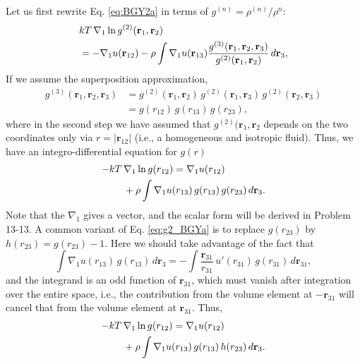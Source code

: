 \documentclass[twocolumn, 10pt]{article}
\numberwithin{equation}{section}
\begin{document}
Let us first rewrite
Eq. \eqref{eq:BGY2a}
in terms of $g^{(n)} = \rho^{(n)}/\rho^n$:
\begin{align}
  & kT \, \nabla_1 \ln g^{(2)}(\mathbf r_1, \mathbf r_2)
  \notag \\
  &=
  -\nabla_1 u(\mathbf r_{12})
  -
  \rho \int
  \nabla_1 u(\mathbf r_{13})
    \frac{
      g^{(3)}(\mathbf r_1, \mathbf r_2, \mathbf r_{3})
    }{
      g^{(2)}(\mathbf r_1, \mathbf r_2)
    }
    \,
  d\mathbf r_3
  ,
  \label{eq:g2_BGYd}
\end{align}
%
If we assume the superposition approximation,
\begin{align*}
  g^{(3)}(\mathbf r_1,\mathbf r_2,\mathbf r_3)
  &=
  g^{(2)}(\mathbf r_1,\mathbf r_2) \,
  g^{(2)}(\mathbf r_1,\mathbf r_3) \,
  g^{(2)}(\mathbf r_2,\mathbf r_3)
  \\
  &=
  g(r_{12}) \, g(r_{13}) \, g(r_{23})
  ,
\end{align*}
where in the second step
we have assumed that $g^{(2)}(\mathbf r_1, \mathbf r_2$
depends on the two coordinates only via $r = |\mathbf r_{12}|$
(i.e., a homogeneous and isotropic fluid).
%
Thus, we have an integro-differential equation for $g(r)$
\begin{align}
  -kT \, & \nabla_1 \ln g(r_{12})
  =
  \nabla_1 u(r_{12})
  \notag
  \\
  &+
  \rho
  \int
  \nabla_1 u(r_{13}) \,
    g(r_{13}) \,
    g(r_{23}) \,
    d\mathbf r_3
  .
  \label{eq:g2_BGYa}
\end{align}
Note that the $\nabla_1$ gives a vector,
and the scalar form will be derived in Problem 13-13.
%
A common variant of Eq. \eqref{eq:g2_BGYa}
is to replace $g(r_{23})$ by
$h(r_{23}) = g(r_{23}) - 1$.
%
Here we should take advantage of the fact that
$$
  \int \nabla_1 u(r_{13}) \,
    g(r_{13}) \,
    d\mathbf r_3
  =
  -\int \frac{\mathbf r_{31}} {r_{31}} \,
    u'(r_{31}) \,
    g(r_{31}) \,
    d\mathbf r_{31}
  ,
$$
and the integrand is an odd function of $\mathbf r_{31}$,
which must vanish after integration over the entire space,
i.e., the contribution from the volume element at $-\mathbf r_{31}$
will cancel that from the volume element at $\mathbf r_{31}$.
Thus,
\begin{align}
  -kT \, & \nabla_1 \ln g(r_{12})
  =
  \nabla_1 u(r_{12})
  \notag
  \\
  &+
  \rho
  \int
  \nabla_1 u(r_{13}) \,
    g(r_{13}) \,
    h(r_{23}) \,
    d\mathbf r_3
  .
  \label{eq:g2_BGYh}
\end{align}
\end{document}
